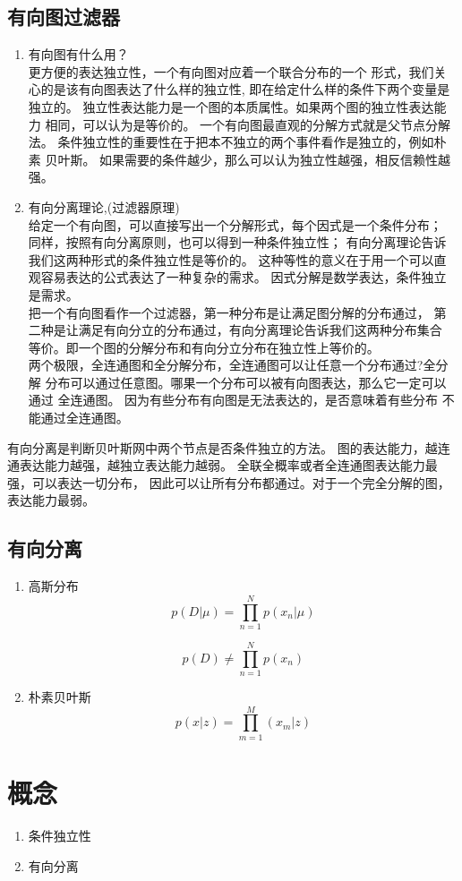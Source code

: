 \subsection{有向图过滤器}
\begin{enumerate}
\item 有向图有什么用？\\
更方便的表达独立性，一个有向图对应着一个联合分布的一个
形式，我们关心的是该有向图表达了什么样的独立性,
即在给定什么样的条件下两个变量是独立的。
独立性表达能力是一个图的本质属性。如果两个图的独立性表达能力
相同，可以认为是等价的。
一个有向图最直观的分解方式就是父节点分解法。
条件独立性的重要性在于把本不独立的两个事件看作是独立的，例如朴素
贝叶斯。
如果需要的条件越少，那么可以认为独立性越强，相反信赖性越强。
\item 有向分离理论,(过滤器原理)\\
给定一个有向图，可以直接写出一个分解形式，每个因式是一个条件分布；
同样，按照有向分离原则，也可以得到一种条件独立性；
有向分离理论告诉我们这两种形式的条件独立性是等价的。
这种等性的意义在于用一个可以直观容易表达的公式表达了一种复杂的需求。
因式分解是数学表达，条件独立是需求。\\
把一个有向图看作一个过滤器，第一种分布是让满足图分解的分布通过，
第二种是让满足有向分立的分布通过，有向分离理论告诉我们这两种分布集合
等价。即一个图的分解分布和有向分立分布在独立性上等价的。\\
两个极限，全连通图和全分解分布，全连通图可以让任意一个分布通过?全分解
分布可以通过任意图。哪果一个分布可以被有向图表达，那么它一定可以通过
全连通图。
因为有些分布有向图是无法表达的，是否意味着有些分布
不能通过全连通图。
\end{enumerate}

有向分离是判断贝叶斯网中两个节点是否条件独立的方法。
图的表达能力，越连通表达能力越强，越独立表达能力越弱。
全联全概率或者全连通图表达能力最强，可以表达一切分布，
因此可以让所有分布都通过。对于一个完全分解的图，表达能力最弱。

\subsection{有向分离}
\begin{enumerate}
\item 高斯分布
\begin{equation}
p(D|\mu) = \prod_{n=1}^Np(x_n|\mu)
\end{equation}

\begin{equation}
p(D) \neq \prod_{n=1}^Np(x_n)
\end{equation}

\item 朴素贝叶斯
\begin{equation}
p(x|z) = \prod_{m=1}^M(x_m|z)
\end{equation}
\end{enumerate}


\section{概念}
\begin{enumerate}
\item 条件独立性
\item 有向分离
\end{enumerate}
